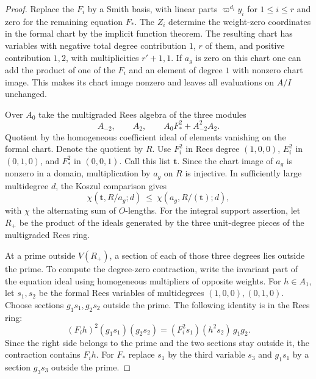 \begin{proof}

Replace the \(F_i\) by a Smith basis, with linear parts
\(\varpi^{d_i}y_i\) for \(1\le i\le r\) and zero for the
remaining equation \(F_*\). The \(Z_i\) determine the
weight-zero coordinates in the formal chart by the implicit
function theorem. The resulting chart has variables with
negative total degree contribution \(1\), \(r\) of them,
and positive contribution \(1,2\), with multiplicities
\(r'+1,1\). If \(a_g\) is zero on this chart one can add the
product of one of the \(F_i\) and an element of degree \(1\)
with nonzero chart image. This makes its chart image
nonzero and leaves all evaluations on \(A/I\) unchanged.

Over \(A_0\) take the multigraded Rees algebra of the three
modules
\[
                   A_{-2},\qquad A_2,\qquad A_0F_*^2+A_{-2}^2A_2.
\]
Quotient by the homogeneous coefficient ideal of
elements vanishing on the formal chart. Denote the quotient
by \(R\). Use \(F_i^2\) in Rees degree \((1,0,0)\),
\(E_i^2\) in \((0,1,0)\), and \(F_*^2\) in \((0,0,1)\).
Call this list \(\mathbf t\). Since the chart image of
\(a_g\) is nonzero in a domain, multiplication by \(a_g\)
on \(R\) is injective. In sufficiently large multidegree
\(d\), the Koszul comparison gives
\[
   \chi(\mathbf t,R/a_g;d)\ \le\
               \chi(a_g,R/(\mathbf t);d),
\]
with \(\chi\) the alternating sum of \(O\)-lengths.
For the integral support assertion, let \(R_{+}\) be the
product of the ideals generated by the three unit-degree
pieces of the multigraded Rees ring.

At a prime outside
\(V(R_+)\), a section of each of those three degrees lies
outside the prime. To compute the degree-zero contraction,
write the invariant part of the equation ideal using
homogeneous multipliers of opposite weights. For \(h\in A_1\), let \(s_1,s_2\) be the formal Rees variables
of multidegrees \((1,0,0),(0,1,0)\). Choose sections
\(g_1s_1,g_2s_2\) outside the prime. The following identity is
in the Rees ring:
\[
    (F_i h)^2(g_1s_1)(g_2s_2)=(F_i^2s_1)(h^2s_2)\,g_1g_2.
\]
Since the right side belongs to the prime and the two sections
stay outside it, the contraction contains \(F_i h\). For \(F_*\)
replace \(s_1\) by the third variable \(s_3\) and \(g_1s_1\)
by a section \(g_3s_3\) outside the prime.


\end{proof}
